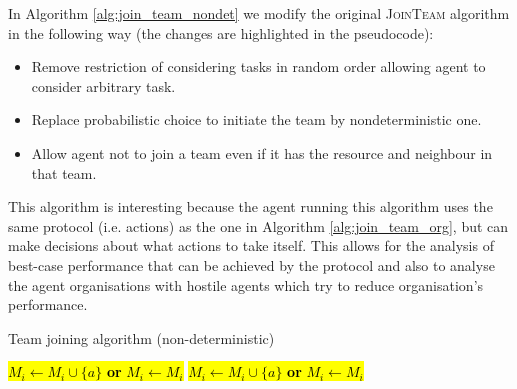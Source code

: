 \documentclass{llncs}
\newcommand{\comment}[1]{{\color{red}{[\sf #1]}}}
\begin{document}
\comment{TL: the problem of developing or learning effective team initialing and team joining policies is also important ...}

In Algorithm \ref{alg:join_team_nondet} we modify the original \textsc{JoinTeam} algorithm in the following way (the changes are highlighted in the pseudocode):
\begin{itemize}
 \item Remove restriction of considering tasks in random order allowing agent to consider arbitrary task.
 \item Replace probabilistic choice to initiate the team by nondeterministic one.
 \item Allow agent not to join a team even if it has the resource and neighbour in that team.
\end{itemize}

This algorithm is interesting because the agent running this algorithm uses the same protocol (i.e. actions) as the one in Algorithm \ref{alg:join_team_org}, but can make decisions about what actions to take itself. This allows for the analysis of best-case performance that can be achieved by the protocol and also to analyse the agent organisations with hostile agents which try to reduce organisation's performance.

\begin{algorithm}[H]
\caption{Team joining algorithm (non-deterministic)}
\label{alg:join_team_nondet}
\begin{scriptsize}
\begin{algorithmic}
     
       
	 
	    \State \hl{$M_i \leftarrow M_i \cup \{a\}$  \textbf{or} $M_i \leftarrow M_i$} 
	\EndIf
       
	 
	  \State \hl{$M_i \leftarrow M_i \cup \{a\}$ \textbf{or} $M_i \leftarrow M_i$} 
	\EndIf
      \EndIf
    \EndIf
  \EndFor
\EndProcedure
\end{algorithmic}
\end{scriptsize}
\end{algorithm}
\end{document}
